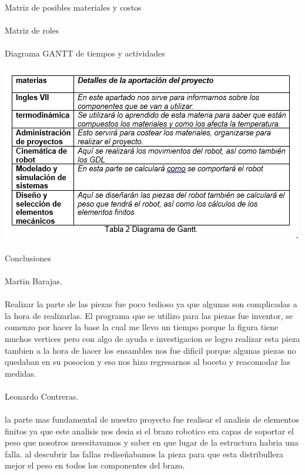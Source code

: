 \documentclass[12pt,letterpaper]{article}
\begin{document}
\newpage
Matriz de posibles materiales y costos
\\\\
Matriz de roles
\\\\
Diagrama GANTT de tiempos y actividades
\\\\
\includegraphics[scale=1.3]{imag5.PNG}  
\\\\
Conclusiones
\\\\
Martin Barajas.
\\\\
Realizar la parte de las piezas fue poco tedioso ya que algunas son complicadas a la hora de realizarlas. El programa que se utilizo para las piezas fue inventor, se comenzo por hacer la base la cual me llevo un tiempo porque la figura tiene muchos vertices pero con algo de ayuda  e investigacion se logro realizar esta pieza tambien a la hora de hacer los ensambles nos fue dificil porque algunas piezas no quedaban en su posocion y eso nos hizo regresarnos al boceto y reacomodar las medidas. 
\\\\
Leonardo Contreras. 
\\\\
la parte mas fundamental de nuestro proyecto fue realisar el analisis de elementos finitos ya que este analisis nos desia si el brazo robotico era capas de soportar el peso que nosotros nesesitavamos y saber en que lugar de la estructura habria una falla. al descubrir las fallas rediseñabamos la pieza para que esta distribullera mejor el peso en todos los componentes del brazo.
\\\\\\\\
\end{document}

